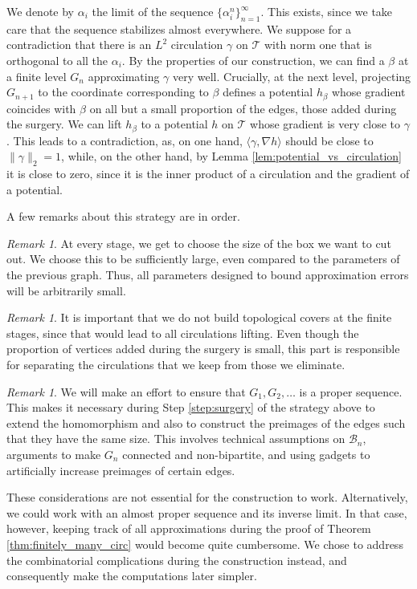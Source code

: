 \documentclass[10pt]{article}
\theoremstyle{plain}
\theoremstyle{remark}
\newtheorem{remark}[lemma]{Remark}
\newcommand{\1}{\mathbbm{1}}
\newcommand{\mcT}{\mathcal{T}}
\numberwithin{equation}{section}
\begin{document}
We denote by $\alpha_i$ the limit of the sequence $\{ \alpha^n_i \}_{n=1}^{\infty}$. This exists, since we take care that the sequence stabilizes almost everywhere. We suppose for a contradiction that there is an $L^2$ circulation $\gamma$ on $\mcT$ with norm one that is orthogonal to all the $\alpha_i$. By the properties of our construction, we can find a $\beta$ at a finite level $G_n$ approximating $\gamma$ very well. Crucially, at the next level, projecting $G_{n+1}$ to the coordinate corresponding to $\beta$ defines a potential $h_{\beta}$ whose gradient coincides with $\beta$ on all but a small proportion of the edges, those added during the surgery. We can lift $h_{\beta}$ to a potential $h$ on $\mcT$ whose gradient is very close to $\gamma$. This leads to a contradiction, as, on one hand, $\langle \gamma , \nabla  h \rangle$ should be close to $\|\gamma\|_2=1$, while, on the other hand, by Lemma \ref{lem:potential_vs_circulation} it is close to zero, since it is the inner product of a circulation and the gradient of a potential.

A few remarks about this strategy are in order.

\begin{remark}
    At every stage, we get to choose the size of the box we want to cut out. We choose this to be sufficiently large, even compared to the parameters of the previous graph. Thus, all parameters designed to bound approximation errors will be arbitrarily small.
\end{remark}

\begin{remark}
It is important that we do not build topological covers at the finite stages, since that would lead to all circulations lifting. Even though the proportion of vertices added during the surgery is small, this part is responsible for separating the circulations that we keep from those we eliminate. 
\end{remark}

\begin{remark} 
We will make an effort to ensure that $G_1, G_2, \ldots$ is a proper sequence. This makes it necessary during Step \ref{step:surgery} of the strategy above to extend the homomorphism and also to construct the preimages of the edges such that they have the same size. This involves technical assumptions on $\mathcal{B}_n$, arguments to make $G_n$ connected and non-bipartite, and using gadgets to artificially increase preimages of certain edges. 

These considerations are not essential for the construction to work. Alternatively, we could work with an almost proper sequence and its inverse limit. In that case, however, keeping track of all approximations during the proof of Theorem \ref{thm:finitely_many_circ} would become quite cumbersome. We chose to address the combinatorial complications during the construction instead, and consequently make the computations later simpler.
\end{remark}
\end{document}
